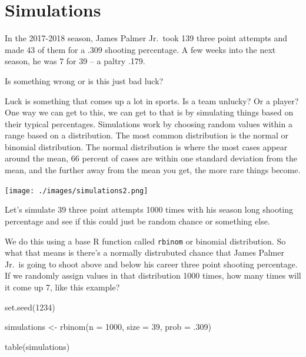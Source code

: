 \documentclass[
  letterpaper,
  DIV=11,
  numbers=noendperiod]{scrreprt}
\newenvironment{Shaded}{\begin{snugshade}}{\end{snugshade}}
\newcommand{\AttributeTok}[1]{\textcolor[rgb]{0.40,0.45,0.13}{#1}}
\newcommand{\DecValTok}[1]{\textcolor[rgb]{0.68,0.00,0.00}{#1}}
\newcommand{\FunctionTok}[1]{\textcolor[rgb]{0.28,0.35,0.67}{#1}}
\newcommand{\NormalTok}[1]{\textcolor[rgb]{0.00,0.23,0.31}{#1}}
\newcommand{\OtherTok}[1]{\textcolor[rgb]{0.00,0.23,0.31}{#1}}
\begin{document}

\hypertarget{simulations}{%
\chapter{Simulations}\label{simulations}}

In the 2017-2018 season, James Palmer Jr.~took 139 three point attempts
and made 43 of them for a .309 shooting percentage. A few weeks into the
next season, he was 7 for 39 -- a paltry .179.

Is something wrong or is this just bad luck?

Luck is something that comes up a lot in sports. Is a team unlucky? Or a
player? One way we can get to this, we can get to that is by simulating
things based on their typical percentages. Simulations work by choosing
random values within a range based on a distribution. The most common
distribution is the normal or binomial distribution. The normal
distribution is where the most cases appear around the mean, 66 percent
of cases are within one standard deviation from the mean, and the
further away from the mean you get, the more rare things become.

\texttt{[image: ./images/simulations2.png]}

Let's simulate 39 three point attempts 1000 times with his season long
shooting percentage and see if this could just be random chance or
something else.

We do this using a base R function called \texttt{rbinom} or binomial
distribution. So what that means is there's a normally distrubuted
chance that James Palmer Jr.~is going to shoot above and below his
career three point shooting percentage. If we randomly assign values in
that distribution 1000 times, how many times will it come up 7, like
this example?

\begin{Shaded}
\begin{Highlighting}[]
\FunctionTok{set.seed}\NormalTok{(}\DecValTok{1234}\NormalTok{)}

\NormalTok{simulations }\OtherTok{\textless{}{-}} \FunctionTok{rbinom}\NormalTok{(}\AttributeTok{n =} \DecValTok{1000}\NormalTok{, }\AttributeTok{size =} \DecValTok{39}\NormalTok{, }\AttributeTok{prob =}\NormalTok{ .}\DecValTok{309}\NormalTok{)}

\FunctionTok{table}\NormalTok{(simulations)}
\end{Highlighting}
\end{Shaded}
\end{document}
